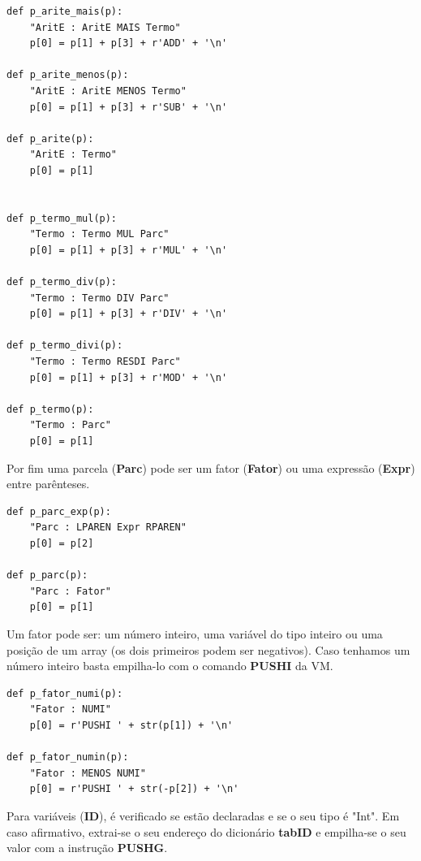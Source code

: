 \documentclass{article}
\begin{document}
\begin{lstlisting}[firstnumber=434]
def p_arite_mais(p):
    "AritE : AritE MAIS Termo"
    p[0] = p[1] + p[3] + r'ADD' + '\n'

def p_arite_menos(p):
    "AritE : AritE MENOS Termo"
    p[0] = p[1] + p[3] + r'SUB' + '\n'

def p_arite(p):
    "AritE : Termo"
    p[0] = p[1]


def p_termo_mul(p):
    "Termo : Termo MUL Parc"
    p[0] = p[1] + p[3] + r'MUL' + '\n'

def p_termo_div(p):
    "Termo : Termo DIV Parc"
    p[0] = p[1] + p[3] + r'DIV' + '\n'

def p_termo_divi(p):
    "Termo : Termo RESDI Parc"
    p[0] = p[1] + p[3] + r'MOD' + '\n'

def p_termo(p):
    "Termo : Parc"
    p[0] = p[1]
\end{lstlisting}

Por fim uma parcela (\textbf{Parc}) pode ser um fator ({\textbf{Fator}}) ou uma expressão (\textbf{Expr}) entre parênteses.

\begin{lstlisting}[firstnumber=464]
def p_parc_exp(p):
    "Parc : LPAREN Expr RPAREN"
    p[0] = p[2]

def p_parc(p):
    "Parc : Fator"
    p[0] = p[1]
\end{lstlisting}

Um fator pode ser: um número inteiro, uma variável do tipo inteiro ou uma posição de um array (os dois primeiros podem ser negativos).
Caso tenhamos um número inteiro basta empilha-lo com o comando \textbf{PUSHI} da VM.

\begin{lstlisting}[firstnumber=473]
def p_fator_numi(p):
    "Fator : NUMI"
    p[0] = r'PUSHI ' + str(p[1]) + '\n'

def p_fator_numin(p):
    "Fator : MENOS NUMI"
    p[0] = r'PUSHI ' + str(-p[2]) + '\n'
\end{lstlisting}

Para variáveis (\textbf{ID}), é verificado se estão declaradas e se o seu tipo é "Int". Em caso afirmativo, extrai-se o seu endereço do dicionário \textbf{tabID} e empilha-se o seu valor com a instrução \textbf{PUSHG}.
\end{document}
